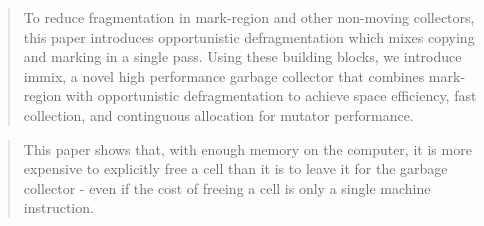 \documentclass[a4paper,oneside]{memoir}
\begin{document}


\blockquote{To reduce fragmentation in mark-region and other non-moving
collectors, this paper introduces opportunistic defragmentation which mixes
copying and marking in a single pass. Using these building blocks, we introduce
immix, a novel high performance garbage collector that combines mark-region with
opportunistic defragmentation to achieve space efficiency, fast collection, and
continguous allocation for mutator performance.\cite{Blackburn:2008}}

\blockquote{This paper shows that, with enough memory on the computer, it is
more expensive to explicitly free a cell than it is to leave it for the garbage
collector - even if the cost of freeing a cell is only a single machine
instruction.}
\cite{Appel:1987}





\end{document}

